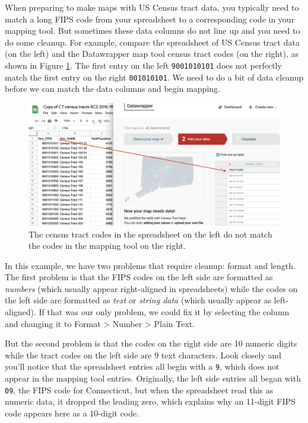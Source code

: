 \documentclass[
  english,
]{book}
\begin{document}
When preparing to make maps with US Census tract data, you typically need to match a long FIPS code from your spreadsheet to a corresponding code in your mapping tool. But sometimes these data columns do not line up and you need to do some cleanup. For example, compare the spreadsheet of US Census tract data (on the left) and the Datawrapper map tool census tract codes (on the right), as shown in Figure \ref{fig:census-code-mismatch}. The first entry on the left \texttt{9001010101} does not perfectly match the first entry on the right \texttt{001010101}. We need to do a bit of data cleanup before we can match the data columns and begin mapping.



\begin{figure}
\centering
\includegraphics{images/04-clean/census-code-mismatch-annotated.png}
\caption{\label{fig:census-code-mismatch}The census tract codes in the spreadsheet on the left do not match the codes in the mapping tool on the right.}
\end{figure}

In this example, we have two problems that require cleanup: format and length. The first problem is that the FIPS codes on the left side are formatted as \emph{numbers} (which usually appear right-aligned in spreadsheets) while the codes on the left side are formatted as \emph{text} or \emph{string data} (which usually appear as left-aligned). If that was our only problem, we could fix it by selecting the column and changing it to Format \textgreater{} Number \textgreater{} Plain Text.

But the second problem is that the codes on the right side are 10 numeric digits while the tract codes on the left side are 9 text characters. Look closely and you'll notice that the spreadsheet entries all begin with a \texttt{9}, which does not appear in the mapping tool entries. Originally, the left side entries all began with \texttt{09}, the FIPS code for Connecticut, but when the spreadsheet read this as numeric data, it dropped the leading zero, which explains why an 11-digit FIPS code appears here as a 10-digit code.
\end{document}
